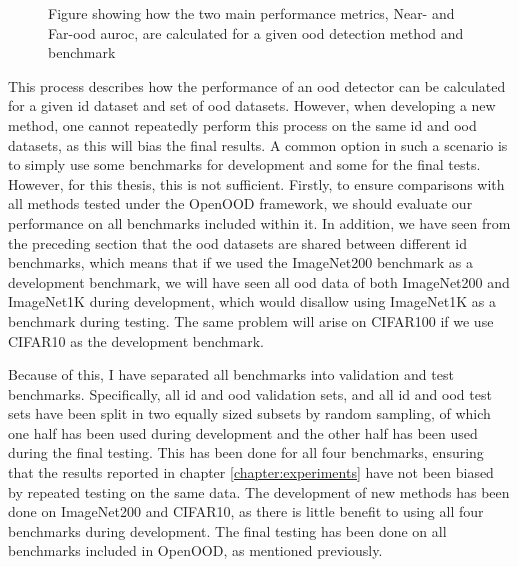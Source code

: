 \documentclass[UKenglish]{uiomasterthesis} %
\theoremstyle{definition}
\begin{document}
\begin{figure}[hbtp]
\begin{center}

    \end{center}
    \caption{Figure showing how the two main performance metrics, Near- and Far-\ac{ood} \ac{auroc}, are calculated for a given \ac{ood} detection method and benchmark}
    \label{fig:testing_environment}
\end{figure}


This process describes how the performance of an \ac{ood} detector can be calculated for a given \ac{id} dataset and set of \ac{ood} datasets. However, when developing a new method, one cannot repeatedly perform this process on the same \ac{id} and \ac{ood} datasets, as this will bias the final results. A common option in such a scenario is to simply use some benchmarks for development and some for the final tests. However, for this thesis, this is not sufficient. Firstly, to ensure comparisons with all methods tested under the OpenOOD framework, we should evaluate our performance on all benchmarks included within it. In addition, we have seen from the preceding section that the \ac{ood} datasets are shared between different \ac{id} benchmarks, which means that if we used the ImageNet200 benchmark as a development benchmark, we will have seen all \ac{ood} data of both ImageNet200 and ImageNet1K during development, which would disallow using ImageNet1K as a benchmark during testing. The same problem will arise on CIFAR100 if we use CIFAR10 as the development benchmark.

Because of this, I have separated all benchmarks into validation and test benchmarks. Specifically, all \ac{id} and \ac{ood} validation sets, and all \ac{id} and \ac{ood} test sets have been split in two equally sized subsets by random sampling, of which one half has been used during development and the other half has been used during the final testing. This has been done for all four benchmarks, ensuring that the results reported in chapter \ref{chapter:experiments} have not been biased by repeated testing on the same data. The development of new methods has been done on ImageNet200 and CIFAR10, as there is little benefit to using all four benchmarks during development. The final testing has been done on all benchmarks included in OpenOOD, as mentioned previously.
\end{document}
